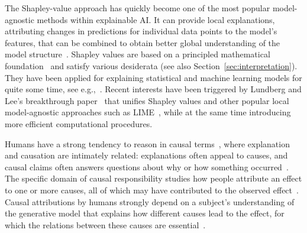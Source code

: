 \documentclass{article}
\begin{document}
The Shapley-value approach has quickly become one of the most popular model-agnostic methods within explainable AI. It can provide local explanations, attributing changes in predictions for individual data points to the model's features, that can be combined to obtain better global understanding of the model structure~\cite{lundberg2020local}. Shapley values are based on a principled mathematical foundation~\cite{shapley1953value} and satisfy various desiderata (see also Section~\ref{sec:interpretation}). They have been applied for explaining statistical and machine learning models for quite some time, see e.g.,~\cite{lipovetsky2001analysis,vstrumbelj2014explaining}. Recent interests have been triggered by Lundberg and Lee's breakthrough paper~\cite{lundberg2017unified} that unifies Shapley values and other popular local model-agnostic approaches such as LIME~\cite{ribeiro2016should}, while at the same time introducing more efficient computational procedures.

Humans have a strong tendency to reason in causal terms~\cite{sloman2005causal}, where explanation and causation are intimately related: explanations often appeal to causes, and causal claims often answers questions about why or how something occurred~\cite{lombrozo2017causal}. The specific domain of causal responsibility studies how people attribute an effect to one or more causes, all of which may have contributed to the observed effect~\cite{sober1988apportioning}. Causal attributions by humans strongly depend on a subject's understanding of the generative model that explains how different causes lead to the effect, for which the relations between these causes are essential~\cite{gerstenberg2012noisy}.



%
%
%
\end{document}
